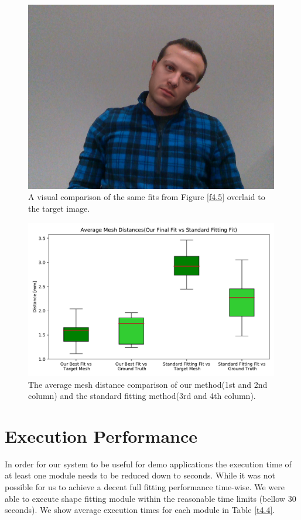 \begin{figure}[h]
\begin{minipage}{.325\textwidth}
      \includegraphics[width=0.99\textwidth]{Figures/dataset/blended/7.png}
    \end{minipage}
    \caption{A  visual comparison of the same fits from Figure \ref{f4.5} overlaid to the target image.}
    \label{f4.6}
\end{figure}
\clearpage
\begin{figure}
  \centering
  \includegraphics[width=0.99\textwidth]{Figures/standard.pdf}
  \caption{The average mesh distance comparison of our method(1st and 2nd column) and the standard fitting method(3rd and 4th column).}
  \label{f4.4}
\end{figure}

\section{Execution Performance}
In order for our system to be useful for demo applications the execution time of at least one module needs to be reduced down to seconds. While it was not possible for us to achieve a decent full fitting performance time-wise. We were able to execute shape fitting module within the reasonable time limits (bellow 30 seconds). We show average execution times for each module in Table \ref{t4.4}. 


